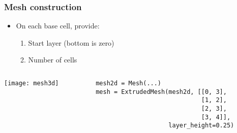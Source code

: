 \documentclass[presentation]{beamer}
\begin{document}
\begin{frame}[fragile]
  \frametitle{Mesh construction}
  \begin{itemize}
  \item On each base cell, provide:
    \begin{enumerate}
    \item Start layer (bottom is zero)
    \item Number of cells
    \end{enumerate}
  \end{itemize}
  \begin{columns}
    \hspace{-2em}
    \begin{column}{0.5\textwidth}
      \begin{center}
        \texttt{[image: mesh3d]}
      \end{center}
    \end{column}
    \begin{column}{0.4\textwidth}
\begin{verbatim}
mesh2d = Mesh(...)
mesh = ExtrudedMesh(mesh2d, [[0, 3],
                             [1, 2],
                             [2, 3],
                             [3, 4]],
                    layer_height=0.25)
\end{verbatim}
    \end{column}
  \end{columns}
\end{frame}
\end{document}
